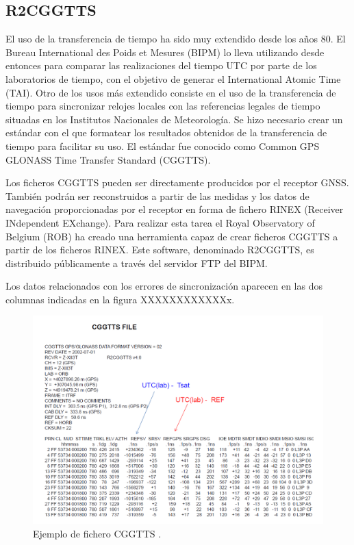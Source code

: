 \subsection{R2CGGTTS}
El uso de la transferencia de tiempo ha sido muy extendido desde los años 80. El Bureau International des Poids et Mesures (BIPM) lo lleva utilizando desde entonces para comparar las realizaciones del tiempo UTC por parte de los laboratorios de tiempo, con el objetivo de generar el International Atomic Time (TAI). Otro de los usos más extendido consiste en el uso de la transferencia de tiempo para sincronizar relojes locales con las referencias legales de tiempo situadas en los Institutos Nacionales de Meteorología. Se hizo necesario crear un estándar con el que formatear los resultados obtenidos de la transferencia de tiempo para facilitar su uso. El estándar fue conocido como Common GPS GLONASS Time Transfer Standard (CGGTTS). \newline

Los ficheros CGGTTS pueden ser directamente producidos por el receptor GNSS. También podrán ser reconstruidos a partir de las medidas y los datos de navegación proporcionadas por el receptor en forma de fichero RINEX (Receiver INdependent EXchange). Para realizar esta tarea el Royal Observatory of Belgium (ROB) ha creado una herramienta capaz de crear ficheros CGGTTS a partir de los ficheros RINEX. Este software, denominado R2CGGTTS, es distribuido públicamente a través del servidor FTP del BIPM. \newline

Los datos relacionados con los errores de sincronización aparecen en las dos columnas indicadas en la figura XXXXXXXXXXXXx.\newline

\begin{figure}[H]
	\centering
	\includegraphics[width=1\textwidth]{imagenes/cggtts.PNG}
	\caption{\label{fig1}Ejemplo de fichero CGGTTS \cite{timetransfer}.}
\end{figure}



